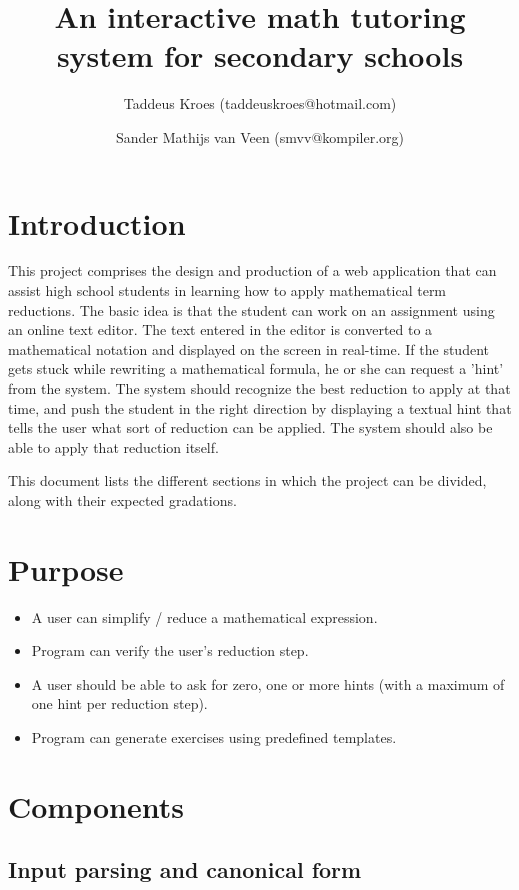 \documentclass[10pt,a4paper]{article}
\title{An interactive math tutoring system for secondary schools}
\author{Taddeus Kroes (taddeuskroes@hotmail.com)
    \and Sander Mathijs van Veen (smvv@kompiler.org)}
\begin{document}
\maketitle

\section{Introduction}

This project comprises the design and production of a web application that can
assist high school students in learning how to apply mathematical term
reductions. The basic idea is that the student can work on an assignment using
an online text editor. The text entered in the editor is converted to a
mathematical notation and displayed on the screen in real-time. If the student
gets stuck while rewriting a mathematical formula, he or she can request a
'hint' from the system. The system should recognize the best reduction to
apply at that time, and push the student in the right direction by displaying
a textual hint that tells the user what sort of reduction can be applied. The
system should also be able to apply that reduction itself.

This document lists the different sections in which the project can be
divided, along with their expected gradations.

\section{Purpose}

\begin{itemize}
    \item A user can simplify / reduce a mathematical expression.
    \item Program can verify the user's reduction step.
    \item A user should be able to ask for zero, one or more hints (with a
    maximum of one hint per reduction step).
    \item Program can generate exercises using predefined templates.
\end{itemize}

\section{Components}

\subsection{Input parsing and canonical form}
\end{document}
